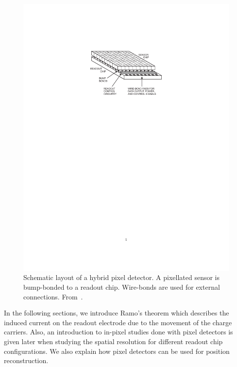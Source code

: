 \begin{figure}[htbp]
  \centering
  \includegraphics[width=\textwidth, trim = 30mm 180mm 30mm 45mm,
  clip]{figures/ChargeSharing/PixelCell.pdf}
  \caption{Schematic layout of a hybrid pixel detector. A pixellated
    sensor is bump-bonded to a readout chip. Wire-bonds are used for
    external connections.
    From~\cite{Spieler2005}.}%
  \label{fig:pixelCell}
\end{figure}

In the following sections, we introduce Ramo's theorem which describes
the induced current on the readout electrode due to the movement of
the charge carriers. Also, an introduction to in-pixel studies done
with pixel detectors is given later when studying the spatial
resolution for different readout chip configurations. We also explain
how pixel detectors can be used for position reconstruction.


